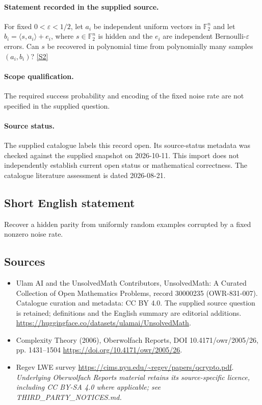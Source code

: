 \documentclass[11pt]{article}
\begin{document}
\paragraph{Statement recorded in the supplied source.}
For fixed $0<\varepsilon<1/2$, let $a_i$ be independent uniform vectors in $\mathbb F_2^n$ and let $b_i=\langle s,a_i\rangle+e_i$, where $s\in\mathbb F_2^n$ is hidden and the $e_i$ are independent Bernoulli-$\varepsilon$ errors. Can $s$ be recovered in polynomial time from polynomially many samples $(a_i,b_i)$? \href{https://doi.org/10.4171/owr/2005/26}{[S2]}
\paragraph{Scope qualification.}
The required success probability and encoding of the fixed noise rate are not specified in the supplied question.
\paragraph{Source status.}
The supplied catalogue labels this record open. Its source-status metadata was checked against the supplied snapshot on 2026-10-11. This import does not independently establish current open status or mathematical correctness. The catalogue literature assessment is dated 2026-08-21.
\subsection{Short English statement}
Recover a hidden parity from uniformly random examples corrupted by a fixed nonzero noise rate.
\subsection{Sources}
\begin{itemize}
\item[S1] Ulam AI and the UnsolvedMath Contributors, UnsolvedMath: A Curated Collection of Open Mathematics Problems, record 30000235 (OWR-831-007). Catalogue curation and metadata: CC BY 4.0. The supplied source question is retained; definitions and the English summary are editorial additions.
\url{https://huggingface.co/datasets/ulamai/UnsolvedMath}.
\item[S2] Complexity Theory (2006), Oberwolfach Reports, DOI 10.4171/owr/2005/26, pp. 1431--1504
\url{https://doi.org/10.4171/owr/2005/26}.
\item[S3] Regev LWE survey
\url{https://cims.nyu.edu/~regev/papers/qcrypto.pdf}.
\textit{Underlying Oberwolfach Reports material retains its source-specific licence, including CC BY-SA 4.0 where applicable; see THIRD\_PARTY\_NOTICES.md.}
\end{itemize}
\end{document}
